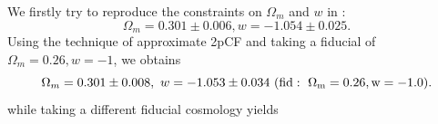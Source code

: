 \documentclass[useAMS,usenatbib]{mnras}
\begin{document}
We firstly try to reproduce the constraints on $\Omega_m$ and $w$ in \citep{Li2016}:
\begin{equation}\label{eq:wcdm_constrain_default}
 \Omega_m=0.301\pm 0.006, w=−1.054\pm 0.025.
\end{equation}
Using the technique of approximate 2pCF and taking a fiducial of $\Omega_m=0.26, w=-1$, we obtains
\begin{equation}
\Omega_m = 0.301 \pm 0.008,\ w=-1.053\pm 0.034\ (\rm fid:\ \Omega_m=0.26, w=-1.0).
\end{equation}
while taking a different fiducial cosmology yields
\end{document}

